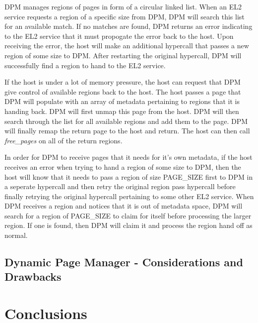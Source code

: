 DPM manages regions of pages in form of a circular linked list. When an EL2 service requests
a region of a specific size from DPM, DPM will search this list for an available match.
If no matches are found, DPM returns an error indicating to the EL2 service that it must
propogate the error back to the host. Upon receiving the error, the host will make an
additional hypercall that passes a new region of some size to DPM. After restarting the original
hypercall, DPM will successfully find a region to hand to the EL2 service.

If the host is under a lot of memory pressure, the host can request that DPM give control
of available regions back to the host. The host passes a page that DPM will populate with
an array of metadata pertaining to regions that it is handing back. DPM will first unmap this
page from the host. DPM will then search through the list for all available regions and add them
to the page. DPM will finally remap the return page to the host and return. The host can then
call \textit{free_pages} on all of the return regions.

In order for DPM to receive pages that it needs for it's own metadata, if the host receives an
error when trying to hand a region of some size to DPM, then the host will know that it needs
to pass a region of size PAGE_SIZE first to DPM in a seperate hypercall and then retry the
original region pass hypercall before finally retrying the original hypercall pertaining
to some other EL2 service. When DPM receives a region and notices that it is out of metadata
space, DPM will search for a region of PAGE_SIZE to claim for itself before processing
the larger region. If one is found, then DPM will claim it and process the region hand off
as normal.

\subsection{Dynamic Page Manager - Considerations and Drawbacks}



\section{Conclusions}

